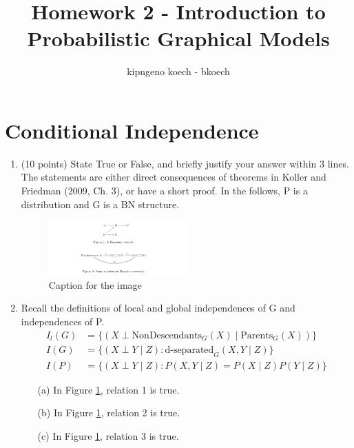 \documentclass[a3paper,12pt]{extarticle} %
\begin{document}
\author{kipngeno koech - bkoech}
\title{Homework 2 - Introduction to Probabilistic Graphical Models}   
\maketitle

\medskip

\maketitle
\section{Conditional Independence}
\begin{enumerate}
    \item (10 points) State True or False, and briefly justify your answer within 3 lines. The statements are either
    direct consequences of theorems in Koller and Friedman (2009, Ch. 3), or have a short proof. In the
    follows, P is a distribution and G is a BN structure.
    \begin{figure}[h!]
        \centering
        \includegraphics[width=0.5\textwidth]{"conditional_independence.png"}
        \caption{Caption for the image}
        \label{fig:example_image}
    \end{figure}
    \item Recall the definitions of local and global independences of G and independences of P.
    \begin{align}
        I_l(G) &= \{(X \perp \text{NonDescendants}_G(X) \mid \text{Parents}_G(X))\} \\
        I(G) &= \{(X \perp Y \mid Z) : \text{d-separated}_G(X, Y \mid Z)\} \\
        I(P) &= \{(X \perp Y \mid Z) : P(X, Y \mid Z) = P(X \mid Z)P(Y \mid Z)\}
    \end{align}
    \begin{enumerate}
        \item[(a)] In Figure \ref{fig:example_image}, relation 1 is true.
        \item[(b)] In Figure \ref{fig:example_image}, relation 2 is true.
        \item[(c)] In Figure \ref{fig:example_image}, relation 3 is true.

\end{enumerate}
\end{enumerate}
\end{document}
